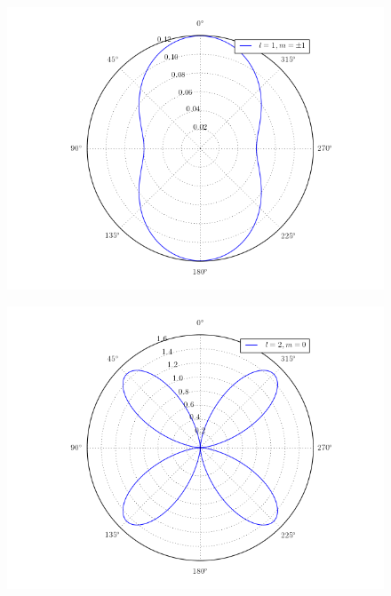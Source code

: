 \documentclass[a4paper,11pt]{article}
\numberwithin{equation}{section}
\begin{document}
\begin{figure}[H]
 \center
 \includegraphics[scale=0.6]{problema3fig3}
\end{figure}

\begin{figure}[H]
 \center
 \includegraphics[scale=0.6]{problema3fig4}
\end{figure}
\end{document}
